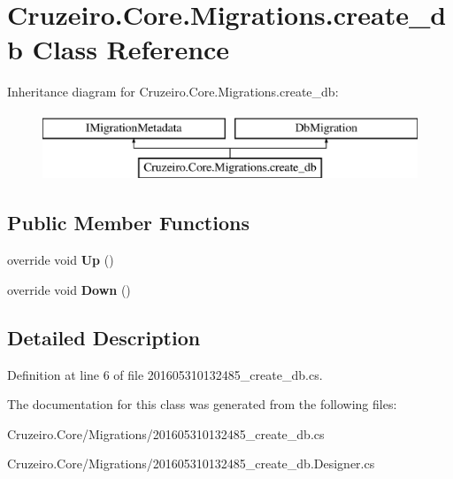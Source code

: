 \hypertarget{class_cruzeiro_1_1_core_1_1_migrations_1_1create__db}{}\section{Cruzeiro.\+Core.\+Migrations.\+create\+\_\+db Class Reference}
\label{class_cruzeiro_1_1_core_1_1_migrations_1_1create__db}
Inheritance diagram for Cruzeiro.\+Core.\+Migrations.\+create\+\_\+db\+:\begin{figure}[H]
\begin{center}
\leavevmode
\includegraphics[height=2.000000cm]{class_cruzeiro_1_1_core_1_1_migrations_1_1create__db}
\end{center}
\end{figure}
\subsection*{Public Member Functions}
\begin{DoxyCompactItemize}
\item 
override void {\bfseries Up} ()\hypertarget{class_cruzeiro_1_1_core_1_1_migrations_1_1create__db_a615b1ce40de712123fab83fda618e543}{}\label{class_cruzeiro_1_1_core_1_1_migrations_1_1create__db_a615b1ce40de712123fab83fda618e543}

\item 
override void {\bfseries Down} ()\hypertarget{class_cruzeiro_1_1_core_1_1_migrations_1_1create__db_aa99e22ad3b70fe3260139fb3271980a0}{}\label{class_cruzeiro_1_1_core_1_1_migrations_1_1create__db_aa99e22ad3b70fe3260139fb3271980a0}

\end{DoxyCompactItemize}


\subsection{Detailed Description}


Definition at line 6 of file 201605310132485\+\_\+create\+\_\+db.\+cs.



The documentation for this class was generated from the following files\+:\begin{DoxyCompactItemize}
\item 
Cruzeiro.\+Core/\+Migrations/201605310132485\+\_\+create\+\_\+db.\+cs\item 
Cruzeiro.\+Core/\+Migrations/201605310132485\+\_\+create\+\_\+db.\+Designer.\+cs\end{DoxyCompactItemize}
